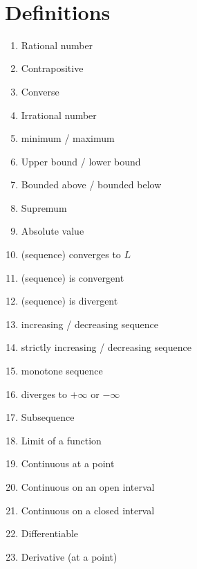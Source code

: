 \documentclass[12pt]{amsart}
\begin{document}

\

\section*{Definitions}

\begin{enumerate}
	\item Rational number
	\item Contrapositive
	\item Converse
	\item Irrational number
	\item minimum / maximum
	\item Upper bound / lower bound
	\item Bounded above / bounded below
	\item Supremum%
			\item Absolute value
	\item (sequence) converges to $L$


	\item (sequence) is convergent
	
	\item (sequence) is divergent

	\item increasing / decreasing sequence
	\item strictly increasing / decreasing sequence
	\item monotone sequence

	\item diverges to $+\infty$ or $-\infty$		
			
	\item Subsequence
	
		


	\item Limit of a function

	\item Continuous at a point

	\item Continuous on an open interval

	\item Continuous on a closed interval
			\item Differentiable
	\item Derivative (at a point)
		\begin{comment}	

	\item Derivative (function)
	\item Local maximum/minimum
		\item Increasing/decreasing function

\end{comment}
\end{enumerate}
\end{document}
